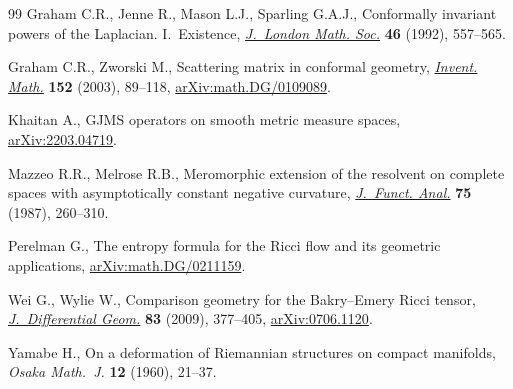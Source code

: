 \documentclass[10pt,a4paper]{amsart}
\numberwithin{equation}{section}
\begin{document}
\begin{thebibliography}{99}
Graham C.R., Jenne R., Mason L.J., Sparling G.A.J., Conformally invariant
 powers of the {L}aplacian. {I}.~{E}xistence, \href{https://doi.org/10.1112/jlms/s2-46.3.557}{\textit{J.~London Math. Soc.}}
 \textbf{46} (1992), 557--565.

Graham C.R., Zworski M., Scattering matrix in conformal geometry,
 \href{https://doi.org/10.1007/s00222-002-0268-1}{\textit{Invent. Math.}} \textbf{152} (2003), 89--118,
 \href{https://arxiv.org/abs/math.DG/0109089}{arXiv:math.DG/0109089}.

Khaitan A., {GJMS} operators on smooth metric measure spaces,
 \href{https://arxiv.org/abs/2203.04719}{arXiv:2203.04719}.

Mazzeo R.R., Melrose R.B., Meromorphic extension of the resolvent on complete
 spaces with asymptotically constant negative curvature, \href{https://doi.org/10.1016/0022-1236(87)90097-8}{\textit{J.~Funct.
 Anal.}} \textbf{75} (1987), 260--310.

Perelman G., The entropy formula for the {R}icci flow and its geometric
 applications, \href{https://arxiv.org/abs/math.DG/0211159}{arXiv:math.DG/0211159}.

Wei G., Wylie W., Comparison geometry for the {B}akry--{E}mery {R}icci tensor,
 \href{https://doi.org/10.4310/jdg/1261495336}{\textit{J.~Differential Geom.}} \textbf{83} (2009), 377--405,
 \href{https://arxiv.org/abs/0706.1120}{arXiv:0706.1120}.

Yamabe H., On a deformation of {R}iemannian structures on compact manifolds,
 \textit{Osaka Math.~J.} \textbf{12} (1960), 21--37.

\end{thebibliography}
\end{document}
